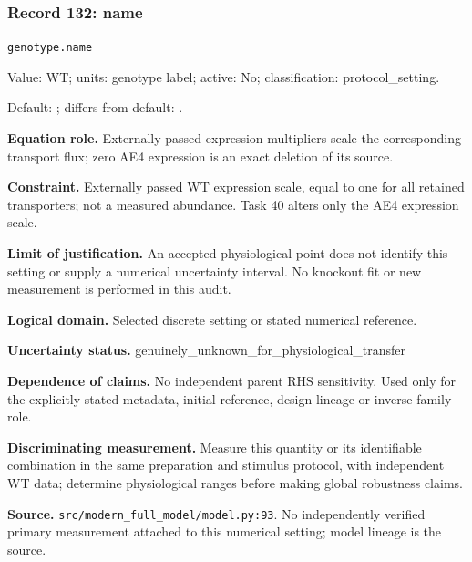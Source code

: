 \subsubsection*{Record 132: name}
{\small \nolinkurl{genotype.name}\par

Value: WT; units: genotype label; active: No; classification: protocol\_setting.\par

Default: ; differs from default: .\par

\textbf{Equation role.} Externally passed expression multipliers scale the corresponding transport flux; zero AE4 expression is an exact deletion of its source.\par

\textbf{Constraint.} Externally passed WT expression scale, equal to one for all retained transporters; not a measured abundance. Task 40 alters only the AE4 expression scale.\par

\textbf{Limit of justification.} An accepted physiological point does not identify this setting or supply a numerical uncertainty interval. No knockout fit or new measurement is performed in this audit.\par

\textbf{Logical domain.} Selected discrete setting or stated numerical reference.\par

\textbf{Uncertainty status.} genuinely\_unknown\_for\_physiological\_transfer\par

\textbf{Dependence of claims.} No independent parent RHS sensitivity. Used only for the explicitly stated metadata, initial reference, design lineage or inverse family role.\par

\textbf{Discriminating measurement.} Measure this quantity or its identifiable combination in the same preparation and stimulus protocol, with independent WT data; determine physiological ranges before making global robustness claims.\par

\textbf{Source.} \nolinkurl{src/modern_full_model/model.py:93}. No independently verified primary measurement attached to this numerical setting; model lineage is the source.\par}

